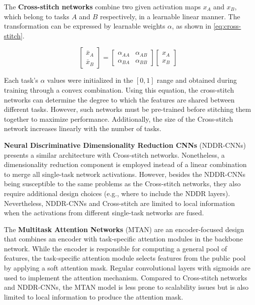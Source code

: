 The \textbf{Cross-stitch networks} \citep{misra2016cross} combine two given activation maps $x_A$ and $x_B$, which belong to tasks $A$ and $B$ respectively, in a learnable linear manner. The transformation can be expressed by learnable weights $\alpha$, as shown in \autoref{eq:cross-stitch}.
 
\begin{equation}
\label{eq:cross-stitch}
\begin{bmatrix}
\bar{x}_A\\ 
\bar{x}_B
\end{bmatrix} = 
\begin{bmatrix}
\alpha_{AA} & \alpha_{AB} \\ 
\alpha_{BA} & \alpha_{BB}
\end{bmatrix}
\begin{bmatrix}
x_A \\ 
x_B
\end{bmatrix}
\end{equation}
 
Each task's $\alpha$ values were initialized in the $[0, 1]$ range and obtained during training through a convex combination. Using this equation, the cross-stitch networks can determine the degree to which the features are shared between different tasks. However, such networks must be pre-trained before stitching them together to maximize performance. Additionally, the size of the Cross-stitch network increases linearly with the number of tasks. 
 
\textbf{Neural Discriminative Dimensionality Reduction CNNs} (NDDR-CNNs) \citep{gao2019nddr} presents a similar architecture with Cross-stitch networks. Nonetheless, a dimensionality reduction component is employed instead of a linear combination to merge all single-task network activations. However, besides the NDDR-CNNs being susceptible to the same problems as the Cross-stitch networks, they also require additional design choices (e.g., where to include the NDDR layers). Nevertheless, NDDR-CNNs and Cross-stitch are limited to local information when the activations from different single-task networks are fused.
 
The \textbf{Multitask Attention Networks} (MTAN) \citep{liu2019end} are an encoder-focused design that combines an encoder with task-specific attention modules in the backbone network. While the encoder is responsible for computing a general pool of features, the task-specific attention module selects features from the public pool by applying a soft attention mask. Regular convolutional layers with sigmoids are used to implement the attention mechanism. Compared to Cross-stitch networks and NDDR-CNNs, the MTAN model is less prone to scalability issues but is also limited to local information to produce the attention mask.
 
